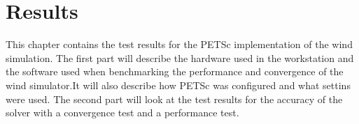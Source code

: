 \chapter{Results}

This chapter contains the test results for the PETSc implementation of the wind
simulation. The first part will describe the hardware used in the workstation
and the software used when benchmarking the performance and convergence of the
wind simulator.It will also describe how PETSc was configured and what settins
were used. 
The second part will look at the test results for the accuracy of the solver
with a convergence test and a performance test. 




